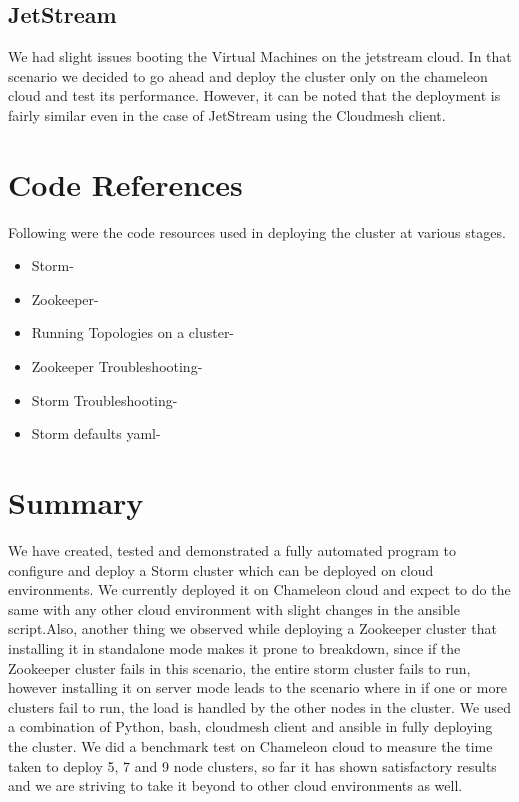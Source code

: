 \documentclass[9pt,twocolumn,twoside]{../../styles/osajnl}
\begin{document}
\subsection{JetStream}

We had slight issues booting the Virtual Machines on the jetstream
cloud. In that scenario we decided to go ahead and deploy the cluster
only on the chameleon cloud and test its performance. However, it can
be noted that the deployment is fairly similar even in the case of
JetStream using the Cloudmesh client.

\section{Code References}
Following were the code resources used in deploying the cluster at various
stages.
\begin{itemize}
\item
  Storm-\cite{www-storm1}\cite{www-storm2}\cite{www-storm3}\cite{www-storm4}\cite{www-storm5}\cite{www-storm6}\cite{www-storm7}\cite{www-storm8}\cite{www-storm9}\cite{www-storm10}
\item
  Zookeeper-\cite{www-zk1}\cite{www-zk2}\cite{www-zk3}\cite{www-zk4}\cite{www-zk5}\cite{www-zk6}\cite{www-zk7}\cite{www-zk8}
\item Running Topologies on a
  cluster-\cite{www-rtc1}\cite{www-rtc2}\cite{www-rtc3}\cite{www-rtc4}\cite{www-rtc5}\cite{www-rtc6}
\item Zookeeper
  Troubleshooting-\cite{www-zt1}\cite{www-zt2}\cite{www-zt3}\cite{www-zt4}\cite{www-zt5}\cite{www-zt6}
\item Storm Troubleshooting-\cite{www-nnf1}\cite{www-nnf2}\cite{www-nnf3}\cite{www-nnf4}
\item Storm defaults yaml-\cite{www-sd1}
\end{itemize}


\section{Summary}

We have created, tested and demonstrated a fully automated program to
configure and deploy a Storm cluster which can be deployed on cloud
environments. We currently deployed it on Chameleon cloud and expect
to do the same with any other cloud environment with slight changes in
the ansible script.Also, another thing we observed while deploying a
Zookeeper cluster that installing it in standalone mode makes it prone
to breakdown, since if the Zookeeper cluster fails in this scenario,
the entire storm cluster fails to run, however installing it on server
mode leads to the scenario where in if one or more clusters fail to
run, the load is handled by the other nodes in the cluster. We used a
combination of Python, bash, cloudmesh client and ansible in fully
deploying the cluster. We did a benchmark test on Chameleon cloud to
measure the time taken to deploy 5, 7 and 9 node clusters, so far it
has shown satisfactory results and we are striving to take it beyond
to other cloud environments as well.
\end{document}
